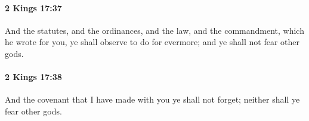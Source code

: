 		\paragraph{2 Kings 17:37} %
			\label{2KINGS-17-37}

			And the statutes, and the ordinances, and the law, and the commandment, which he wrote for you, ye shall observe to do for evermore; and ye shall not fear other gods.


		\paragraph{2 Kings 17:38} %
			\label{2KINGS-17-38}

			And the covenant that I have made with you ye shall not forget; neither shall ye fear other gods.


